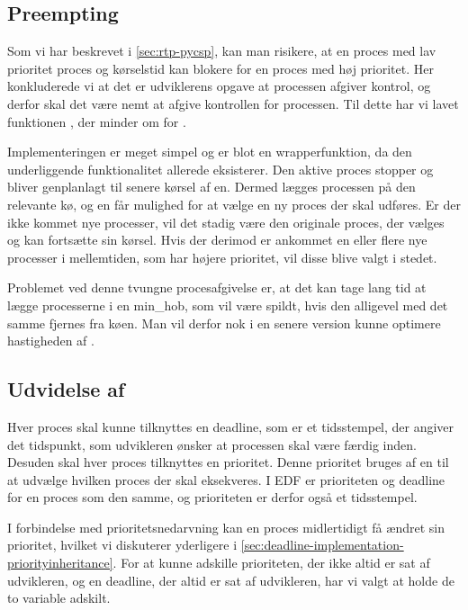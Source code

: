 \subsection{Preempting}

Som vi har beskrevet i \cref{sec:rtp-pycsp}, kan  man risikere, at en proces med lav prioritet proces og kørselstid kan blokere for en proces med høj prioritet. 
Her konkluderede vi at det er udviklerens opgave at processen afgiver kontrol, og derfor skal det være nemt at afgive kontrollen for processen. Til dette har vi lavet funktionen , der minder om  for .

Implementeringen er meget simpel og er blot en wrapperfunktion, da den underliggende funktionalitet allerede eksisterer. Den aktive proces stopper og bliver genplanlagt til senere kørsel af \sched en. Dermed lægges processen på den relevante kø, og  \sched en får mulighed for at vælge en ny proces der skal udføres. Er der ikke kommet nye processer, vil det stadig være den originale proces, der vælges og kan fortsætte sin kørsel. Hvis der derimod er ankommet en eller flere nye processer i mellemtiden, som har højere prioritet, vil disse blive valgt i stedet.

Problemet ved denne tvungne procesafgivelse er, at det kan tage lang tid at lægge processerne i en min\_hob, som vil være spildt, hvis den alligevel med det samme fjernes fra køen. Man vil derfor nok i en senere version kunne optimere hastigheden af .

\subsection{Udvidelse af }
Hver proces skal kunne tilknyttes en deadline, som er et tidsstempel, der angiver det tidspunkt, som udvikleren ønsker at processen skal være færdig inden. 
Desuden skal hver proces tilknyttes en prioritet. Denne prioritet bruges af \sched en til at udvælge hvilken proces der skal eksekveres. I EDF er prioriteten og deadline for en proces som  den samme, og prioriteten er derfor også et tidsstempel.

I forbindelse med prioritetsnedarvning kan en proces midlertidigt få ændret sin prioritet, hvilket vi diskuterer yderligere i \cref{sec:deadline-implementation-priorityinheritance}. For at kunne adskille prioriteten, der ikke altid er sat af udvikleren, og en deadline, der altid er sat af udvikleren, har vi  valgt at holde de to variable adskilt. 

